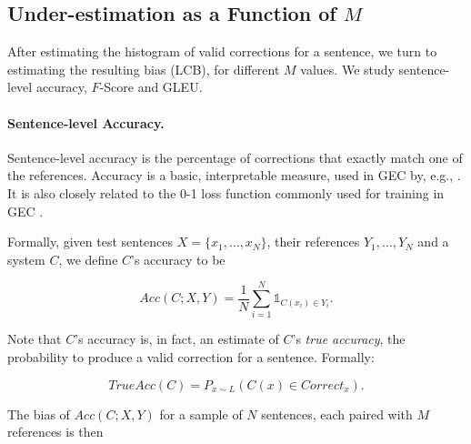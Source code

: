 \documentclass[11pt, a4paper]{article}
\newenvironment{myequation}{
  \vspace{-1em}
 \begin{equation}
}{
 \end{equation}
 \vspace{-1.2em}
}
\begin{document}
\subsection{Under-estimation as a Function of $M$} \label{subsec:Assessment-values}

After estimating the histogram of valid corrections for a sentence, we turn to estimating the resulting bias (LCB), for different $M$ values. 
We study sentence-level accuracy, $F$-Score and GLEU.

\paragraph{Sentence-level Accuracy.}
Sentence-level accuracy is the percentage of corrections that
exactly match one of the references.
Accuracy is a basic, interpretable measure, used in GEC by, e.g., .
It is also closely related to the 0-1 loss function commonly used
for training in GEC \cite{chodorow2012problems,rozovskaya2013joint}. 

Formally, given test sentences $X=\{x_1,\ldots,x_N\}$,
their references $Y_1,\ldots,Y_N$ and a system $C$,
we define $C$'s accuracy to be

\begin{small}
  \centering
  \begin{myequation}\label{eq:acc_def}
    Acc\left(C;X,Y\right) = \frac{1}{N} \sum_{i=1}^N \mathds{1}_{C(x_i) \in Y_i}.
  \end{myequation}
\end{small}

Note that $C$'s accuracy is, in fact, an estimate of $C$'s {\it true accuracy}, the probability to produce a valid correction for a sentence. Formally:

 \begin{small}
   \centering
       \begin{myequation}
     TrueAcc\left(C\right) = P_{x\sim{L}}\left(C\left(x\right)\in Correct_x\right).
   \end{myequation}
 \end{small}
%

The bias of $Acc\left(C;X,Y\right)$ for a sample of $N$ sentences, each paired with $M$ references
is then
\end{document}

